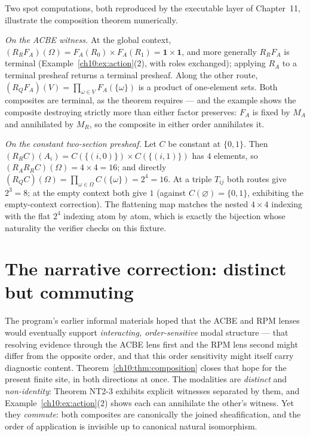 \begin{example}
\label{ch10:ex:bothroutes}
Two spot computations, both reproduced by the executable layer of
Chapter~11, illustrate the composition theorem numerically.

\emph{On the ACBE witness.} At the global context,
$(R_R F_A)(\Omega) = F_A(R_0) \times F_A(R_1) = \mathbf{1} \times
\mathbf{1}$, and more generally $R_R F_A$ is terminal
(Example~\ref{ch10:ex:action}(2), with roles exchanged); applying
$R_A$ to a terminal presheaf returns a terminal presheaf. Along the
other route, $(R_Q F_A)(V) = \prod_{\omega \in V} F_A(\{\omega\})$ is
a product of one-element sets. Both composites are terminal, as the
theorem requires --- and the example shows the composite destroying
strictly more than either factor preserves: $F_A$ is fixed by $M_A$
and annihilated by $M_R$, so the composite in either order
annihilates it.

\emph{On the constant two-section presheaf.} Let $C$ be constant at
$\{0, 1\}$. Then $(R_R C)(A_i) = C(\{(i,0)\}) \times C(\{(i,1)\}) $
has $4$ elements, so $(R_A R_R C)(\Omega) = 4 \times 4 = 16$; and
directly $(R_Q C)(\Omega) = \prod_{\omega \in \Omega} C(\{\omega\})
= 2^4 = 16$. At a triple $T_{ij}$ both routes give $2^3 = 8$; at the
empty context both give $1$ (against $C(\varnothing) = \{0,1\}$,
exhibiting the empty-context correction). The flattening map matches
the nested $4 \times 4$ indexing with the flat $2^4$ indexing atom by
atom, which is exactly the bijection whose naturality the verifier
checks on this fixture.
\end{example}

\section{The narrative correction: distinct but commuting}
\label{ch10:sec:narrative}

\begin{finding}
\label{ch10:fnd:narrative}
The program's earlier informal materials hoped that the ACBE and RPM lenses
would eventually support \emph{interacting, order-sensitive} modal structure
--- that resolving evidence through the ACBE lens first and the RPM lens
second might differ from the opposite order, and that this order sensitivity
might itself carry diagnostic content. Theorem~\ref{ch10:thm:composition}
closes that hope for the present finite site, in both directions at once. The
modalities are \emph{distinct} and \emph{non-identity}: Theorem NT2-3
exhibits explicit witnesses separated by them, and
Example~\ref{ch10:ex:action}(2) shows each can annihilate the other's
witness. Yet they \emph{commute}: both composites are canonically the joined
sheafification, and the order of application is invisible up to canonical
natural isomorphism.
\end{finding}

